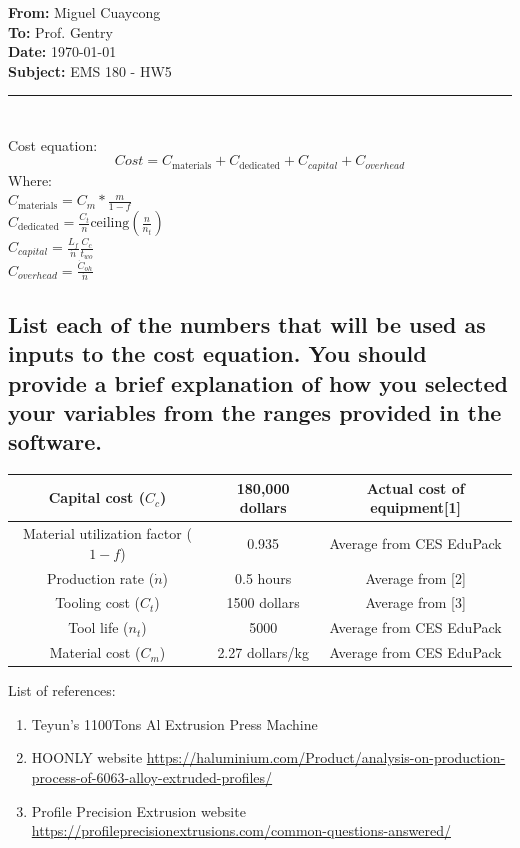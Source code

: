 \documentclass[11pt]{article}
\newcommand{\memoheader}[4]{
  \noindent
  \textbf{From:} #2\\ 
  \textbf{To:} #1\\
  \textbf{Date:} #3\\
  \textbf{Subject:} #4\\[1ex]\hrule\vspace{1.5ex}
}
\begin{document}
\memoheader{Prof. Gentry}
            {Miguel Cuaycong}
            {\today}
            {EMS 180 - HW5}
\section{}
Cost equation: $$Cost = C_{\text{materials}} + C_{\text{dedicated}} + C_{capital} + C_{overhead}$$
Where:
\\
$C_{\text{materials}} = C_m*\frac{m}{1-f}$
\\
$C_{\text{dedicated}} = \frac{C_t}{n}\text{ceiling}(\frac{n}{n_t})$
\\
$C_{capital} = \frac{L_f}{\dot{n}} \frac{C_c}{t_{wo}}$
\\
$C_{overhead}=\frac{\dot{C}_{oh}}{\dot{n}}$
\subsection{List each of the numbers that will be used as inputs to the cost equation. You
should provide a brief explanation of how you selected your variables from the ranges
provided in the software.}
\begin{center}
  \begin{tabular}{|c|c|c|}
    \hline
    Capital cost ($C_c$) & 180,000 dollars & Actual cost of equipment[1]
    \\
    \hline
    Material utilization factor ($1-f$) & 0.935 & Average from CES EduPack
    \\
    \hline
    Production rate ($\dot{n}$)& 0.5 hours & Average from [2]
    \\
    \hline
    Tooling cost ($C_t$)& 1500 dollars & Average from [3]
    \\
    \hline
    Tool life ($n_t$)& 5000 & Average from CES EduPack
    \\
    \hline
    Material cost ($C_m$) & 2.27 dollars/kg & Average from CES EduPack
    \\
    \hline
  \end{tabular}
\end{center}
List of references:
\begin{enumerate}
  \item Teyun's 1100Tons Al Extrusion Press Machine
  \item HOONLY website \url{https://haluminium.com/Product/analysis-on-production-process-of-6063-alloy-extruded-profiles/}
  \item Profile Precision Extrusion website \url{https://profileprecisionextrusions.com/common-questions-answered/}
\end{enumerate}
\end{document}
